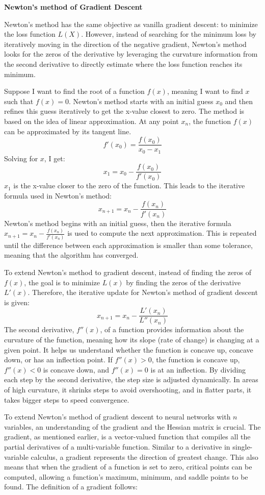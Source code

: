 \documentclass[12pt]{article}
\theoremstyle{definition}
\begin{document}
\begin{flushleft}
\textbf{Newton's method of Gradient Descent}
\end{flushleft}
Newton’s method has the same objective as vanilla gradient descent: to minimize the loss function $L(X)$. However, instead of searching for the minimum loss by iteratively moving in the direction of the negative gradient, Newton's method looks for the zeros of the derivative by leveraging the curvature information from the second derivative to directly estimate where the loss function reaches its minimum.

Suppose I want to find the root of a function $f(x)$, meaning I want to find $x$ such that $f(x)=0$. Newton's method starts with an initial guess $x_0$ and then refines this guess iteratively to get the x-value closest to zero. The method is based on the idea of linear approximation. At any point $x_n$, the function $f(x)$ can be approximated by its tangent line.
\[
f'(x_0)=\frac{f(x_0)}{x_0 - x_1}
\]
Solving for $x$, I get:
\[
x_1 = x_0 - \frac{f(x_0)}{f'(x_0)}
\]
$x_1$ is the x-value closer to the zero of the function. This leads to the iterative formula used in Newton's method:
\[
x_{n+1} = x_n - \frac{f(x_n)}{f'(x_n)}
\]
Newton’s method begins with an initial guess, then the iterative formula $x_{n+1} = x_n - \frac{f(x_n)}{f'(x_n)}$ is used to compute the next approximation. This is repeated until the difference between each approximation is smaller than some tolerance, meaning that the algorithm has converged.

To extend Newton's method to gradient descent, instead of finding the zeros of $f(x)$, the goal is to minimize $L(x)$ by finding the zeros of the derivative $L'(x)$. Therefore, the iterative update for Newton's method of gradient descent is given:
\[
x_{n+1} = x_n - \frac{L'(x_n)}{L''(x_n)}
\]
The second derivative, $f''(x)$, of a function provides information about the curvature of the function, meaning how its slope (rate of change) is changing at a given point. It helps us understand whether the function is concave up, concave down, or has an inflection point. If $f''(x)>0$, the function is concave up, $f''(x)<0$ is concave down, and $f''(x)=0$ is at an inflection. By dividing each step by the second derivative, the step size is adjusted dynamically. In areas of high curvature, it shrinks steps to avoid overshooting, and in flatter parts, it takes bigger steps to speed convergence.

To extend Newton's method of gradient descent to neural networks with $n$ variables, an understanding of the gradient and the Hessian matrix is crucial. The gradient, as mentioned earlier, is a vector-valued function that compiles all the partial derivatives of a multi-variable function. Similar to a derivative in single-variable calculus, a gradient represents the direction of greatest change. This also means that when the gradient of a function is set to zero, critical points can be computed, allowing a function's maximum, minimum, and saddle points to be found. The definition of a gradient follows:
\end{document}
